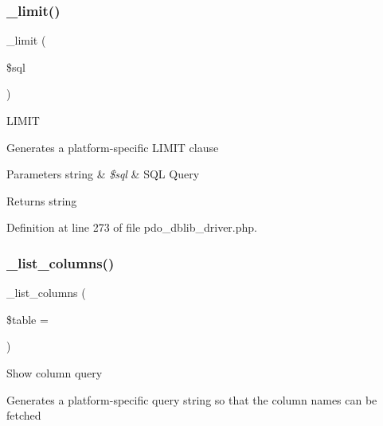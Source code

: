 \mbox{\label{class_c_i___d_b__pdo__dblib__driver_a3a02ea06541b8ecc25a33a61651562c8}} 
\subsubsection{\texorpdfstring{\_limit()}{\_limit()}}
{\footnotesize\ttfamily \+\_\+limit (\begin{DoxyParamCaption}\item[{}]{\$sql }\end{DoxyParamCaption})\hspace{0.3cm}{\ttfamily [protected]}}

L\+I\+M\+IT

Generates a platform-\/specific L\+I\+M\+IT clause


\begin{DoxyParams}[1]{Parameters}
string & {\em \$sql} & S\+QL Query \\
\hline
\end{DoxyParams}
\begin{DoxyReturn}{Returns}
string 
\end{DoxyReturn}


Definition at line 273 of file pdo\+\_\+dblib\+\_\+driver.\+php.

\mbox{\label{class_c_i___d_b__pdo__dblib__driver_a7ccb7f9c301fe7f0a9db701254142b63}} 
\subsubsection{\texorpdfstring{\_list\_columns()}{\_list\_columns()}}
{\footnotesize\ttfamily \+\_\+list\+\_\+columns (\begin{DoxyParamCaption}\item[{}]{\$table = {\ttfamily \textquotesingle{}\textquotesingle{}} }\end{DoxyParamCaption})\hspace{0.3cm}{\ttfamily [protected]}}

Show column query

Generates a platform-\/specific query string so that the column names can be fetched


